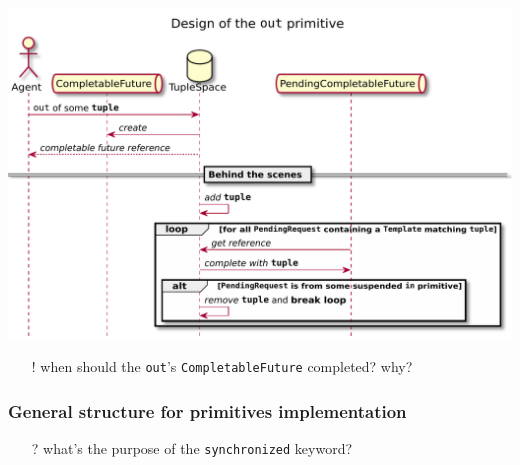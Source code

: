 \documentclass[presentation]{beamer}\mode<presentation>{\usetheme{AMSCesenaPurpleAndGold}}
\begin{document}
\begin{frame}

	\begin{center}
		\includegraphics[width=.9\linewidth]{./img/out-design.pdf}
	\end{center}
	\begin{itemize}
		\item[!] when should the \texttt{out}'s \texttt{CompletableFuture} completed? why?
	\end{itemize}

\end{frame}

\begin{frame}
\frametitle{General structure for primitives implementation}



\begin{itemize}
	\item[?] what's the purpose of the \texttt{\alert{synchronized}} keyword?
\end{itemize}

\end{frame}

%	
%
%
%
%
\end{document}
